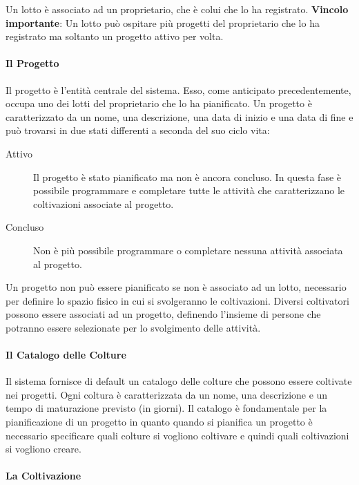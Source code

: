 \documentclass[12pt,a4paper]{article}
\begin{document}
Un lotto è associato ad un proprietario, che è colui che lo ha registrato.
\textbf{Vincolo importante}: Un lotto può ospitare più progetti del proprietario che lo ha
registrato ma soltanto un progetto attivo per volta.

\paragraph{Il Progetto}

Il progetto è l'entità centrale del sistema. Esso, come anticipato precedentemente, occupa
uno dei lotti del proprietario che lo ha pianificato. Un progetto è caratterizzato da un
nome, una descrizione, una data di inizio e una data di fine e può trovarsi in due stati
differenti a seconda del suo ciclo vita:

\begin{description}
    \item[Attivo] Il progetto è stato pianificato ma non è ancora concluso. In questa fase
        è possibile programmare e completare tutte le attività che caratterizzano le
        coltivazioni associate al progetto.
    \item[Concluso] Non è più possibile programmare o completare nessuna attività associata
        al progetto.
\end{description}

Un progetto non può essere pianificato se non è associato ad un lotto, necessario per
definire lo spazio fisico in cui si svolgeranno le coltivazioni. Diversi coltivatori possono
essere associati ad un progetto, definendo l'insieme di persone che potranno essere
selezionate per lo svolgimento delle attività.

\paragraph{Il Catalogo delle Colture}

Il sistema fornisce di default un catalogo delle colture che possono essere coltivate nei
progetti. Ogni coltura è caratterizzata da un nome, una descrizione e un tempo di maturazione
previsto (in giorni). Il catalogo è fondamentale per la pianificazione di un progetto in
quanto quando si pianifica un progetto è necessario specificare quali colture si vogliono
coltivare e quindi quali coltivazioni si vogliono creare.

\paragraph{La Coltivazione}
\end{document}
